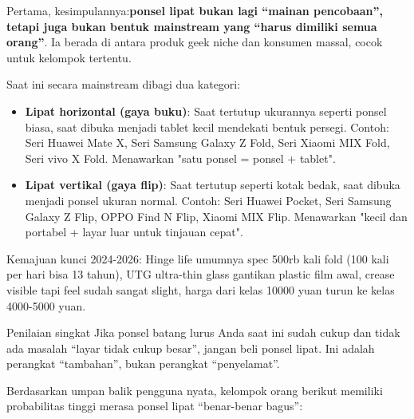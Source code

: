 


Pertama, kesimpulannya:\textbf{ponsel lipat bukan lagi “mainan pencobaan”, tetapi juga bukan bentuk mainstream yang “harus dimiliki semua orang”}. Ia berada di antara produk geek niche dan konsumen massal, cocok untuk kelompok tertentu.

Saat ini secara mainstream dibagi dua kategori:

\begin{itemize}
  \item \textbf{Lipat horizontal (gaya buku)}: Saat tertutup ukurannya seperti ponsel biasa, saat dibuka menjadi tablet kecil mendekati bentuk persegi. Contoh: Seri Huawei Mate X, Seri Samsung Galaxy Z Fold, Seri Xiaomi MIX Fold, Seri vivo X Fold. Menawarkan "satu ponsel = ponsel + tablet".
  \item \textbf{Lipat vertikal (gaya flip)}: Saat tertutup seperti kotak bedak, saat dibuka menjadi ponsel ukuran normal. Contoh: Seri Huawei Pocket, Seri Samsung Galaxy Z Flip, OPPO Find N Flip, Xiaomi MIX Flip. Menawarkan "kecil dan portabel + layar luar untuk tinjauan cepat".
\end{itemize}

Kemajuan kunci 2024-2026: Hinge life umumnya spec 500rb kali fold (100 kali per hari bisa 13 tahun), UTG ultra-thin glass gantikan plastic film awal, crease visible tapi feel sudah sangat slight, harga dari kelas 10000 yuan turun ke kelas 4000-5000 yuan.

\begin{tcbinfo}{Penilaian singkat}
Jika ponsel batang lurus Anda saat ini sudah cukup dan tidak ada masalah “layar tidak cukup besar”, jangan beli ponsel lipat. Ini adalah perangkat “tambahan”, bukan perangkat “penyelamat”.

\end{tcbinfo}


Berdasarkan umpan balik pengguna nyata, kelompok orang berikut memiliki probabilitas tinggi merasa ponsel lipat “benar-benar bagus”:

